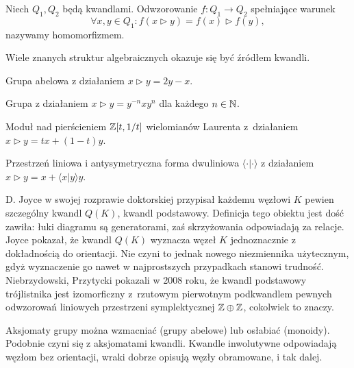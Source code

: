 \begin{definition}
    Niech $Q_1, Q_2$ będą kwandlami.
    Odwzorowanie $f \colon Q_1 \to Q_2$ spełniające warunek
    \begin{equation}
        \forall x, y \in Q_1 : f(x \triangleright y) = f(x) \triangleright f(y),
    \end{equation}
    nazywamy homomorfizmem.
\end{definition}

Wiele znanych struktur algebraicznych okazuje się być źródłem kwandli.

\begin{example}
    Grupa abelowa z działaniem $x \triangleright y = 2y - x$.
\end{example}

\begin{example}
    Grupa z działaniem $x \triangleright y = y^{-n} x y^n$ dla każdego $n \in \mathbb N$.
\end{example}

\begin{example}
    Moduł nad pierścieniem $\mathbb Z[t, 1/t]$ wielomianów Laurenta z~działaniem $x \triangleright y = tx + (1-t) y$.
\end{example}

\begin{example}
    Przestrzeń liniowa i antysymetryczna forma dwuliniowa $\langle \cdot | \cdot \rangle$ z działaniem $x \triangleright y = x + \langle x | y \rangle y$.
\end{example}

D. Joyce w swojej rozprawie doktorskiej przypisał każdemu węzłowi $K$ pewien szczególny kwandl $Q(K)$, kwandl podstawowy.
Definicja tego obiektu jest dość zawiła: łuki diagramu są generatorami, zaś skrzyżowania odpowiadają za relacje.
Joyce pokazał, że kwandl $Q(K)$ wyznacza węzeł $K$ jednoznacznie z dokładnością do orientacji.
Nie czyni to jednak nowego niezmiennika użytecznym, gdyż wyznaczenie go nawet w najprostszych przypadkach stanowi trudność.
Niebrzydowski, Przytycki pokazali w 2008 roku, że kwandl podstawowy trójlistnika jest izomorficzny z~rzutowym pierwotnym podkwandlem pewnych odwzorowań liniowych przestrzeni symplektycznej $\mathbb Z \oplus \mathbb Z$, cokolwiek to znaczy.

Aksjomaty grupy można wzmacniać (grupy abelowe) lub osłabiać (monoidy).
Podobnie czyni się z aksjomatami kwandli.
Kwandle inwolutywne odpowiadają węzłom bez orientacji, wraki dobrze opisują węzły obramowane, i tak dalej.

